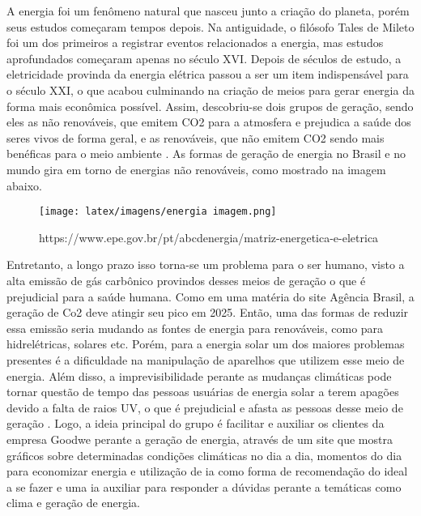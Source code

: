\documentclass{tcc}
\begin{document}
A energia foi um fenômeno natural que nasceu junto a criação do planeta, porém seus estudos começaram tempos depois. Na antiguidade, o filósofo Tales de Mileto foi um dos primeiros a registrar eventos relacionados a energia, mas estudos aprofundados começaram apenas no século XVI. Depois de séculos de estudo, a eletricidade provinda da energia elétrica passou a ser um item indispensável para o século XXI, o que acabou culminando na criação de meios para gerar energia da forma mais econômica possível. Assim, descobriu-se dois grupos de geração, sendo eles as não renováveis, que emitem CO2 para a atmosfera e prejudica a saúde dos seres vivos de forma geral, e as renováveis, que não emitem CO2 sendo mais benéficas para o meio ambiente \cite{MundoEducacao}.
As formas de geração de energia no Brasil e no mundo gira em torno de energias não renováveis, como mostrado na imagem abaixo.

\begin{figure}[H]
    \centering
    \texttt{[image: latex/imagens/energia imagem.png]}
    \caption{ https://www.epe.gov.br/pt/abcdenergia/matriz-energetica-e-eletrica}
    \label{fig:bad_images}
\end{figure}

Entretanto, a longo prazo isso torna-se um problema para o ser humano, visto a alta emissão de gás carbônico provindos desses meios de geração o que é prejudicial para a saúde humana. Como em uma matéria do site Agência Brasil, a geração de Co2 deve atingir seu pico em 2025\cite{AgenciaEscola}. Então, uma das formas de reduzir essa emissão seria mudando as fontes de energia para renováveis, como para hidrelétricas, solares etc. Porém, para a energia solar um dos maiores problemas presentes é a dificuldade na manipulação de aparelhos que utilizem esse meio de energia. Além disso, a imprevisibilidade perante as mudanças climáticas pode tornar questão de tempo das pessoas usuárias de energia solar a terem apagões devido a falta de raios UV, o que é prejudicial e afasta as pessoas desse meio de geração \cite{MundoEscola2}.
Logo, a ideia principal do grupo é facilitar e auxiliar os clientes da empresa Goodwe perante a geração de energia, através de um site que mostra gráficos sobre determinadas condições climáticas no dia a dia, momentos do dia para economizar energia e utilização de ia como forma de recomendação do ideal a se fazer e uma ia auxiliar para responder a dúvidas perante a temáticas como clima e geração de energia.
\end{document}
